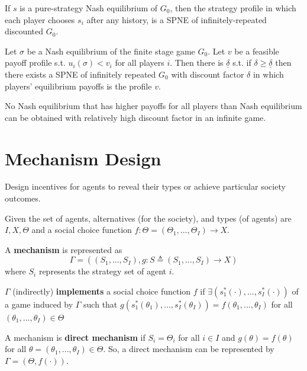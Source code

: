 \documentclass[11pt]{elegantbook}
\begin{document}
\begin{corollary}
    If $s$ is a pure-strategy Nash equilibrium of $G_0$, then the strategy profile in which each player chooses $s_i$ after any history, is a SPNE of infinitely-repeated discounted $G_0$.
\end{corollary}

\begin{proposition}
    Let $\sigma$ be a Nash equilibrium of the finite stage game $G_0$. Let $v$ be a feasible payoff profile s.t. $u_i(\sigma) < v_i$ for all players $i$. Then there is $\underline{\delta}$ s.t. if $\delta\geq \underline{\delta}$ then there exists a SPNE of infinitely repeated $G_0$ with discount factor $\delta$ in which players' equilibrium payoffs is the profile $v$.
\end{proposition}
No Nash equilibrium that has higher payoffs for all players than Nash equilibrium can be obtained with relatively high discount factor in an infinite game.








\section{Mechanism Design}
Design incentives for agents to reveal their types or achieve particular society outcomes.

Given the set of agents, alternatives (for the society), and types (of agents) are $I, X, \Theta$ and a social choice function $f:\Theta=(\Theta_1,...,\Theta_I) \rightarrow X$.

\begin{definition}[Mechanism]
    \normalfont
    A \textbf{mechanism} is represented as $$\Gamma=\left((S_1,...,S_I), g:S\triangleq(S_1,...,S_I) \rightarrow X\right)$$
    where $S_i$ represents the strategy set of agent $i$.
\end{definition}

\begin{definition}[Implement]
    \normalfont
    $\Gamma$ (indirectly) \textbf{implements} a social choice function $f$ if $\exists \left(s_1^*(\cdot),...,s_I^*(\cdot)\right)$ of a game induced by $\Gamma$ such that $g(s_1^*(\theta_1),...,s_I^*(\theta_I))=f(\theta_1,...,\theta_I)$ for all $(\theta_1,...,\theta_I)\in \Theta$
\end{definition}

\begin{definition}
    \normalfont
    A mechanism is \textbf{direct mechanism} if $S_i=\Theta_i$ for all $i\in I$ and $g(\theta)=f(\theta)$ for all $\theta=(\theta_1,...,\theta_I)\in\Theta$. So, a direct mechanism can be represented by $\Gamma=(\Theta,f(\cdot))$.
\end{definition}
\end{document}
